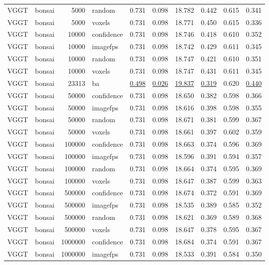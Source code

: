\begin{table}[H]
\begin{tabular}{llrlrrrrrr}
VGGT & bonsai & 5000 & random & 0.731 & 0.098 & 18.782 & 0.442 & 0.615 & 0.341 \\
VGGT & bonsai & 5000 & voxels & 0.731 & 0.098 & 18.771 & 0.450 & 0.615 & 0.336 \\
VGGT & bonsai & 10000 & confidence & 0.731 & 0.098 & 18.746 & 0.418 & 0.610 & 0.352 \\
VGGT & bonsai & 10000 & imagefps & 0.731 & 0.098 & 18.742 & 0.429 & 0.611 & 0.345 \\
VGGT & bonsai & 10000 & random & 0.731 & 0.098 & 18.747 & 0.421 & 0.610 & 0.351 \\
VGGT & bonsai & 10000 & voxels & 0.731 & 0.098 & 18.747 & 0.431 & 0.611 & 0.345 \\
VGGT & bonsai & 23313 & ba & \underline{0.498} & \underline{0.026} & \underline{19.837} & \underline{0.319} & 0.620 & \underline{0.440} \\
VGGT & bonsai & 50000 & confidence & 0.731 & 0.098 & 18.650 & 0.382 & 0.598 & 0.366 \\
VGGT & bonsai & 50000 & imagefps & 0.731 & 0.098 & 18.616 & 0.398 & 0.598 & 0.355 \\
VGGT & bonsai & 50000 & random & 0.731 & 0.098 & 18.671 & 0.381 & 0.599 & 0.367 \\
VGGT & bonsai & 50000 & voxels & 0.731 & 0.098 & 18.661 & 0.397 & 0.602 & 0.359 \\
VGGT & bonsai & 100000 & confidence & 0.731 & 0.098 & 18.663 & 0.374 & 0.596 & 0.369 \\
VGGT & bonsai & 100000 & imagefps & 0.731 & 0.098 & 18.596 & 0.391 & 0.594 & 0.357 \\
VGGT & bonsai & 100000 & random & 0.731 & 0.098 & 18.664 & 0.374 & 0.595 & 0.369 \\
VGGT & bonsai & 100000 & voxels & 0.731 & 0.098 & 18.647 & 0.387 & 0.599 & 0.363 \\
VGGT & bonsai & 500000 & confidence & 0.731 & 0.098 & 18.674 & 0.372 & 0.591 & 0.369 \\
VGGT & bonsai & 500000 & imagefps & 0.731 & 0.098 & 18.535 & 0.389 & 0.585 & 0.352 \\
VGGT & bonsai & 500000 & random & 0.731 & 0.098 & 18.621 & 0.369 & 0.589 & 0.368 \\
VGGT & bonsai & 500000 & voxels & 0.731 & 0.098 & 18.647 & 0.378 & 0.595 & 0.367 \\
VGGT & bonsai & 1000000 & confidence & 0.731 & 0.098 & 18.684 & 0.374 & 0.591 & 0.367 \\
VGGT & bonsai & 1000000 & imagefps & 0.731 & 0.098 & 18.533 & 0.391 & 0.584 & 0.350 \\

\end{tabular}
\end{table}
